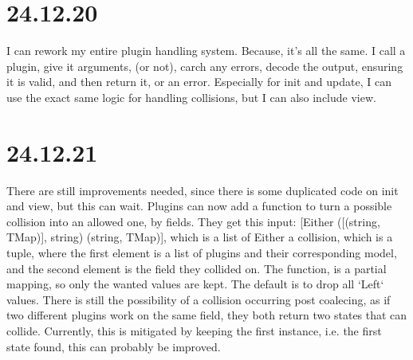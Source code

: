 \section{24.12.20}

I can rework my entire plugin handling system. Because, it's all the same. I
call a plugin, give it arguments, (or not), carch any errors, decode the output,
ensuring it is valid, and then return it, or an error. Especially for init and
update, I can use the exact same logic for handling collisions, but I can also
include view.

\section{24.12.21}

There are still improvements needed, since there is some duplicated code on init
and view, but this can wait. Plugins can now add a function to turn a possible
collision into an allowed one, by fields. They get this input:
[Either ([(string, TMap)], string) (string, TMap)], which is a list of Either
a collision, which is a tuple, where the first element is a list of plugins and
their corresponding model, and the second element is the field they collided on.
The function, is a partial mapping, so only the wanted values are kept. The
default is to drop all `Left` values. There is still the possibility of a
collision occurring post coalecing, as if two different plugins work on the same
field, they both return two states that can collide. Currently, this is
mitigated by keeping the first instance, i.e. the first state found, this can
probably be improved.
